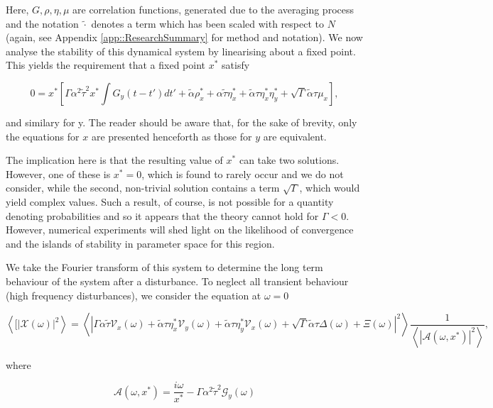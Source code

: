 \documentclass[.../main.tex]{subfiles}
\begin{document}
    Here, $G, \rho, \eta, \mu$ are correlation functions, generated due to the averaging process 
    and the notation $\tilde{\cdot}$ denotes a term which has been scaled with respect to $N$ 
    (again, see Appendix \ref{app::ResearchSummary} for method and notation). We now analyse the
    stability of this dynamical system by linearising about a fixed point. This yields the
    requirement that a fixed point $x^*$ satisfy

    \begin{equation}
    0 = x^* \left[\Gamma \alpha^2 \tilde{\tau}^2 x^* \int G_y(t - t') dt' + \tilde{\alpha} \rho_x^*
    + \alpha \tilde{\tau} \eta_x^* + \tilde{\alpha} \tau \eta_x^* \eta_y^* + \sqrt{\Gamma} 
    \tilde{\alpha} \tau \mu_x \right],
    \end{equation}

    and similary for y. The reader should be aware that, for the sake of brevity, only the equations
    for $x$ are presented henceforth as those for $y$ are equivalent.

    The implication here is that the resulting value of $x^*$ can take two
    solutions. However, one of these is $x^* = 0$, which is found to rarely
    occur \cite{Coolen2005} and we do not consider, while the second,
    non-trivial solution contains a term $\sqrt{\Gamma}$, which would yield
    complex values. Such a result, of course, is not possible for a quantity
    denoting probabilities and so it appears that the theory cannot hold for
    $\Gamma < 0$. However, numerical experiments will shed light on the
    likelihood of convergence and the islands of stability in parameter space
    for this region.

    We take the Fourier transform of this system to determine the long term behaviour of the system
    after a disturbance. To neglect all transient behaviour (high frequency disturbances), we
    consider the equation at $\omega = 0$

    \begin{equation} \label{eqn::Transformed}
    \left<[|\mathcal{X}(\omega)|^2 \right> = \left< | \Gamma \alpha \tilde{\tau} \mathcal{V}_x(\omega) + \tilde{\alpha} \tau \eta^*_x \mathcal{V}_y(\omega) + \tilde{\alpha} \tau \eta^*_y \mathcal{V}_x(\omega) + \sqrt{\Gamma} \tilde{\alpha} \tau \Delta(\omega) + \Xi(\omega) |^2 \right> \frac{1}{\left< |\mathcal{A}(\omega, x^*) |^2 \right>}, 
    \end{equation}


    where

    \begin{equation}
        \mathcal{A}(\omega, x^*) = \frac{i \omega}{x^*} - \Gamma \alpha^2 \tilde{\tau}^2 \mathcal{G}_y(\omega)
    \end{equation}
\end{document}
